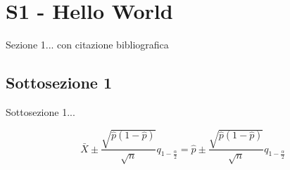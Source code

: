 % 



\section{S1 - Hello World \label{sec:sezione1}}


Sezione 1... con citazione bibliografica~\cite{CleanCode}

\subsection{Sottosezione 1}
\label{subsec:sottosezione1}

Sottosezione 1...

$$\bar{X}\pm\frac{\sqrt{\hat{p}(1-\hat{p})}}{\sqrt{n}}q_{1-\frac{\alpha}{2}} = \hat{p}\pm\frac{\sqrt{\hat{p}(1-\hat{p})}}{\sqrt{n}}q_{1-\frac{\alpha}{2}}$$
